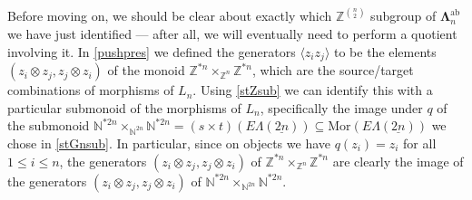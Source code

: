 \documentclass{amsbook} %
\newcommand{\MLn}{\mathbf{\Lambda}_n}
\newcommand{\ELnn}{E\Lambda(\underline{2n})}
\numberwithin{section}{chapter}
\begin{document}
Before moving on, we should be clear about exactly which $\mathbb{Z}^{{n}\choose{2}}$ subgroup of $\MLn^{\mathrm{ab}}$ we have just identified --- after all, we will eventually need to perform a quotient involving it. In \cref{pushpres} we defined the generators $\langle z_i z_j \rangle$ to be the elements $(z_i \otimes z_j, z_j \otimes z_i)$ of the monoid $\mathbb{Z}^{\ast n} \times_{\mathbb{Z}^n} \mathbb{Z}^{\ast n}$, which are the source/target combinations of morphisms of $L_n$. Using \cref{stZsub} we can identify this with a particular submonoid of the morphisms of $L_n$, specifically the image under $q$ of the submonoid $\mathbb{N}^{\ast 2n} \times_{\mathbb{N}^{2n}} \mathbb{N}^{\ast 2n} = (s \times t)(\ELnn) \subseteq \mathrm{Mor}(\ELnn)$ we chose in \cref{stGnsub}. In particular, since on objects we have $q(z_i) = z_i$ for all $1 \le i \le n$, the generators $(z_i \otimes z_j, z_j \otimes z_i)$ of $\mathbb{Z}^{\ast n} \times_{\mathbb{Z}^n} \mathbb{Z}^{\ast n}$ are clearly the image of the generators $(z_i \otimes z_j, z_j \otimes z_i)$ of $\mathbb{N}^{\ast 2n} \times_{\mathbb{N}^{2n}} \mathbb{N}^{\ast 2n}$. 
\end{document}
